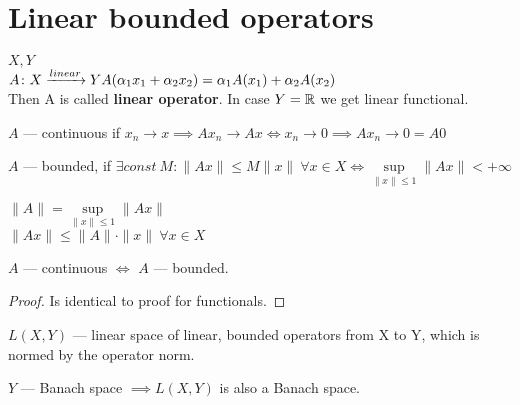 \section{Linear bounded operators}
\begin{defn}
  $X, Y$ \\
  $A \colon X \xrightarrow{linear} Y\\
  A(\alpha_1 x_1 + \alpha_2 x_2) = \alpha_1A(x_1) + \alpha_2 A(x_2)$ \\
  Then A is called \textbf{linear operator}. In case $Y = \mathbb{R}$ we get linear functional.
\end{defn}

\begin{defn}
  $A$ --- continuous if $x_n \to x \implies Ax_n \to Ax \iff x_n \to 0 \implies
  Ax_n \to 0 = A0$
\end{defn}

\begin{defn}
  $A$ --- bounded, if $\exists const\ M : \|Ax\| \leq M \|x\|\ \forall x \in X
  \iff \sup\limits_{\|x\| \leq 1} \|Ax\| < +\infty$
\end{defn}

\begin{defn}
  $\|A\| = \sup\limits_{\|x\| \leq 1} \|Ax\|$ \\
  $\|Ax\| \leq \|A\| \cdot \|x\|\ \forall x \in X$
\end{defn}

\begin{thm}
  $A$ --- continuous $\iff$ $A$ --- bounded.
\end{thm}

\begin{proof}
  Is identical to proof for functionals.
\end{proof}

\begin{note}
  $L(X, Y)$ --- linear space of linear, bounded operators from X to Y, which is
  normed by the operator norm.
\end{note}

\begin{thm}
  $Y$ --- Banach space $\implies L(X, Y)$ is also a Banach space.
\end{thm}

